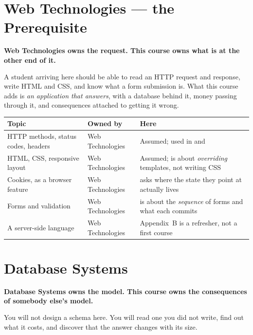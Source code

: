 \section{Web Technologies --- the Prerequisite}

\begin{conceptbox}
\textbf{Web Technologies owns the request. This course owns what is at the
other end of it.}

\smallskip
A student arriving here should be able to read an HTTP request and response,
write HTML and CSS, and know what a form submission is. What this course adds
is \emph{an application that answers}, with a database behind it, money passing
through it, and consequences attached to getting it wrong.
\end{conceptbox}

\begin{longtable}{@{}L{6.8cm}L{3.4cm}L{4.2cm}@{}}
\toprule
{}
\textbf{Topic} & \textbf{Owned by} & \textbf{Here} \\
\midrule
\endhead
HTTP methods, status codes, headers & Web Technologies & Assumed; used in
 and  \\
HTML, CSS, responsive layout & Web Technologies & Assumed;  is about
\emph{overriding} templates, not writing CSS \\
Cookies, as a browser feature & Web Technologies &  asks where
the state they point at actually lives \\
Forms and validation & Web Technologies &  is about the
\emph{sequence} of forms and what each commits \\
A server-side language & Web Technologies & Appendix~B is a refresher, not a
first course \\
\bottomrule
\end{longtable}

\section{Database Systems}

\begin{conceptbox}
\textbf{Database Systems owns the model. This course owns the consequences of
somebody else's model.}

\smallskip
You will not design a schema here. You will read one you did not write, find
out what it costs, and discover that the answer changes with its size.
\end{conceptbox}

